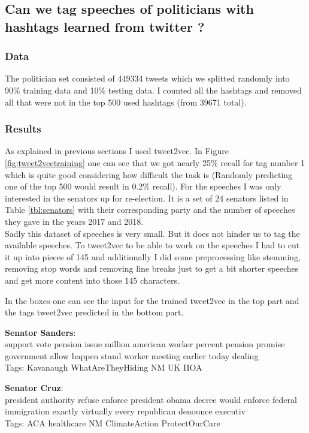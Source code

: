 \documentclass[10pt,conference,compsocconf]{IEEEtran}
\begin{document}
\subsection{Can we tag speeches of politicians with hashtags learned from twitter ? }
\subsubsection{Data}
The politician set consisted of 449334 tweets which we splitted randomly into 90\% training data and 10\% testing data. I counted all the hashtags and removed all that were not in the top 500 used hashtags (from 39671 total).  

\subsubsection{Results}

As explained in previous sections I used tweet2vec.  In Figure \ref{fig:tweet2vectraining} one can see that we got nearly 25\% recall for tag number 1 which is quite good considering how difficult the task is (Randomly predicting one of the top 500 would result in 0.2\% recall). For the speeches I was only interested in the senators up for re-election. It is a set of 24 senators listed in Table \ref{tbl:senators} with their corresponding party and the number of speeches they gave in the years 2017 and 2018. \\
Sadly this dataset of speeches is very small. But it does not hinder us to tag the available speeches. To tweet2vec to be able to work on the speeches I had to cut it up into pieces of 145 and additionally I did some preprocessing like stemming, removing stop words and removing line breaks just to get a bit shorter speeches and get more content into those 145 characters. 

In the boxes one can see the input for the trained tweet2vec in the top part and the tags tweet2vec predicted in the bottom part. 

\begin{framed}
	\textbf{Senator Sanders}: \\
	support vote pension issue million american worker percent pension promise government allow happen stand worker meeting earlier today dealing \\
	Tags: Kavanaugh WhatAreTheyHiding NM UK IIOA
\end{framed}
\begin{framed}
	\textbf{Senator Cruz}: \\
 president authority refuse enforce president obama decree would enforce federal immigration exactly virtually every republican denounce executiv
 \\
	Tags: ACA healthcare NM ClimateAction ProtectOurCare
\end{framed}
\end{document}

